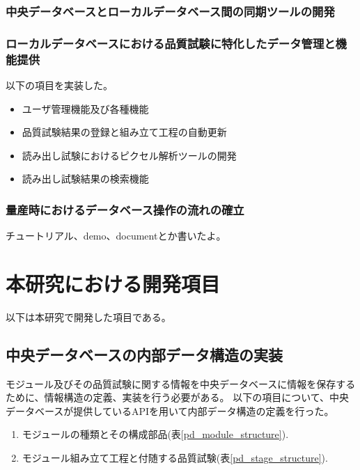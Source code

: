 \subsubsection{中央データベースとローカルデータベース間の同期ツールの開発}
\subsubsection{ローカルデータベースにおける品質試験に特化したデータ管理と機能提供}
以下の項目を実装した。
\begin{itemize}
  \item ユーザ管理機能及び各種機能
  \item 品質試験結果の登録と組み立て工程の自動更新
  \item 読み出し試験におけるピクセル解析ツールの開発
  \item 読み出し試験結果の検索機能
\end{itemize}

\subsubsection{量産時におけるデータベース操作の流れの確立}
チュートリアル、demo、documentとか書いたよ。

\clearpage
\section{本研究における開発項目}
以下は本研究で開発した項目である。

\subsection{中央データベースの内部データ構造の実装}

モジュール及びその品質試験に関する情報を中央データベースに情報を保存するために、情報構造の定義、実装を行う必要がある。
以下の項目について、中央データベースが提供しているAPIを用いて内部データ構造の定義を行った。
\begin{enumerate}
  \item モジュールの種類とその構成部品(表\ref{pd_module_structure}).
  \item モジュール組み立て工程と付随する品質試験(表\ref{pd_stage_structure}).
\end{enumerate}

